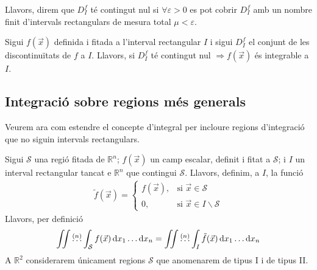 Llavors, direm que $D_{I}^{f}$ té contingut nul si $\forall \varepsilon > 0$ es pot cobrir $D_{I}^{f}$ amb un nombre finit d'intervals rectangulars de mesura total $\mu < \varepsilon$.
\begin{thm}
	Sigui $f(\vec{x})$ definida i fitada a l'interval rectangular $I$ i sigui $D^{f}_{I}$ el conjunt de les discontinuïtats de $f$ a $I$. Llavors, si $D^{f}_{I}$ té contingut nul $\Rightarrow f(\vec{x})$ és integrable a $I$.
\end{thm}

\subsection{Integració sobre regions més generals}
Veurem ara com estendre el concepte d'integral per incloure regions d'integració que no siguin intervals rectangulars.

Sigui $\mathcal{S}$ una regió fitada de $\mathbb{R}^{n}$; $f(\vec{x})$ un camp escalar, definit i fitat a $\mathcal{S}$; i $I$ un interval rectangular tancat e $\mathbb{R}^{n}$ que contingui $\mathcal{S}$. Llavors, definim, a $I$, la funció
\begin{align}
	\tilde{f} (\vec{x}) = \begin{cases} f(\vec{x}), &\text{si } \vec{x} \in \mathcal{S} \\ 0, &\text{si } \vec{x} \in I \backslash \mathcal{S} \end{cases}
\end{align}
Llavors, per definició
\begin{align}
	\iint \overset{(n)}{\dots} \int_{\mathcal{S}} f(\vec{x}) \mathop{}\!\mathrm{d} x_{1} \dots \mathrm{d} x_{n} = \iint \overset{(n)}{\dots} \int_{I} \tilde{f}(\vec{x}) \mathop{}\!\mathrm{d} x_{1} \dots \mathrm{d} x_{n}
\end{align}
A $\mathbb{R}^{2}$ considerarem únicament regions $\mathcal{S}$ que anomenarem de tipus I i de tipus II.

